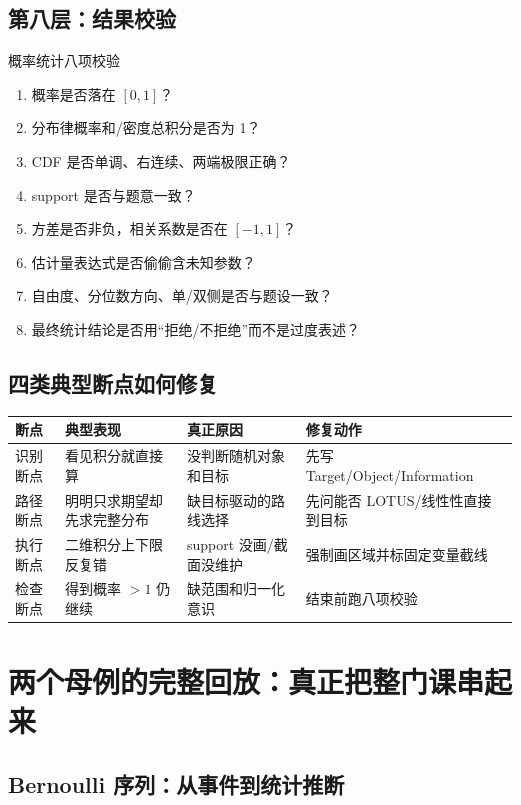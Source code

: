 \documentclass[11pt,a4paper,openany]{ctexbook}
\begin{document}
\section{第八层：结果校验}
\begin{corebox}{概率统计八项校验}
\begin{enumerate}
  \item 概率是否落在 $[0,1]$？
  \item 分布律概率和/密度总积分是否为 1？
  \item CDF 是否单调、右连续、两端极限正确？
  \item support 是否与题意一致？
  \item 方差是否非负，相关系数是否在 $[-1,1]$？
  \item 估计量表达式是否偷偷含未知参数？
  \item 自由度、分位数方向、单/双侧是否与题设一致？
  \item 最终统计结论是否用“拒绝/不拒绝”而不是过度表述？
\end{enumerate}
\end{corebox}

\section{四类典型断点如何修复}
\begin{longtable}{L{2.8cm}L{4.5cm}L{4.6cm}L{\dimexpr\linewidth-12.87cm\relax}}
\toprule
\textbf{断点} & \textbf{典型表现} & \textbf{真正原因} & \textbf{修复动作}\\
\midrule
识别断点 & 看见积分就直接算 & 没判断随机对象和目标 & 先写 Target/Object/Information\\
路径断点 & 明明只求期望却先求完整分布 & 缺目标驱动的路线选择 & 先问能否 LOTUS/线性性直接到目标\\
执行断点 & 二维积分上下限反复错 & support 没画/截面没维护 & 强制画区域并标固定变量截线\\
检查断点 & 得到概率 $>1$ 仍继续 & 缺范围和归一化意识 & 结束前跑八项校验\\
\bottomrule
\end{longtable}

\chapter{两个母例的完整回放：真正把整门课串起来}

\section{Bernoulli 序列：从事件到统计推断}
\end{document}
